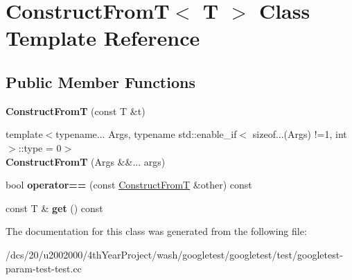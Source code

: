 \hypertarget{classConstructFromT}{}\section{Construct\+FromT$<$ T $>$ Class Template Reference}
\label{classConstructFromT}
\subsection*{Public Member Functions}
\begin{DoxyCompactItemize}
\item 
\mbox{\label{classConstructFromT_ab51c4af9cd06643dc6c1406cea4e4a33}} 
{\bfseries Construct\+FromT} (const T \&t)
\item 
\mbox{\label{classConstructFromT_af12cf80ecbf28d8e4bd588b2b57b11b9}} 
{\footnotesize template$<$typename... Args, typename std\+::enable\+\_\+if$<$ sizeof...(\+Args) !=1, int $>$\+::type  = 0$>$ }\\{\bfseries Construct\+FromT} (Args \&\&... args)
\item 
\mbox{\label{classConstructFromT_ad3db2a9b424fc87e1f20a080af167419}} 
bool {\bfseries operator==} (const \mbox{\hyperlink{classConstructFromT}{Construct\+FromT}} \&other) const
\item 
\mbox{\label{classConstructFromT_aabffa9bb57d7147453fb07153ad52285}} 
const T \& {\bfseries get} () const
\end{DoxyCompactItemize}


The documentation for this class was generated from the following file\+:\begin{DoxyCompactItemize}
\item 
/dcs/20/u2002000/4th\+Year\+Project/wash/googletest/googletest/test/googletest-\/param-\/test-\/test.\+cc\end{DoxyCompactItemize}
